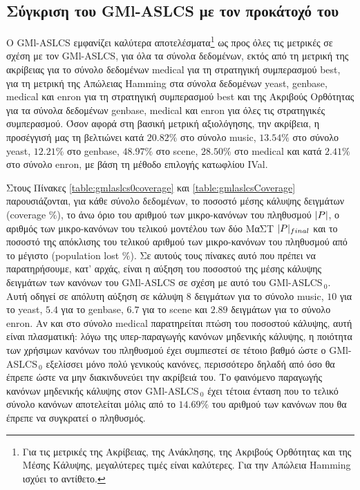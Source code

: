 \subsection{Σύγκριση του GMl-ASLCS με τον προκάτοχό του}
Ο GMl-ASLCS εμφανίζει καλύτερα αποτελέσματα\footnote{Για τις μετρικές της Ακρίβειας, της Ανάκλησης, της Ακριβούς Ορθότητας και της Μέσης Κάλυψης, μεγαλύτερες τιμές είναι καλύτερες. Για την Απώλεια Hamming ισχύει το αντίθετο.} ως προς όλες τις μετρικές σε σχέση με τον GMl-ASLCS, για όλα τα σύνολα δεδομένων, εκτός από τη μετρική της ακρίβειας για το σύνολο δεδομένων medical για τη στρατηγική συμπερασμού best, για τη μετρική της Απώλειας Hamming στα σύνολα δεδομένων yeast, genbase, medical και enron για τη στρατηγική συμπερασμού best και της Ακριβούς Ορθότητας για τα σύνολα δεδομένων genbase, medical και enron για όλες τις στρατηγικές συμπερασμού. Όσον αφορά στη βασική μετρική αξιολόγησης, την ακρίβεια, η προσέγγισή μας τη βελτιώνει κατά $20.82\%$ στο σύνολο music, $13.54\%$ στο σύνολο yeast, $12.21\%$ στο genbase,  
$48.97\%$ στο scene, $28.50\%$ στο medical και κατά $2.41\%$ στο σύνολο enron, με βάση τη μέθοδο επιλογής κατωφλίου IVal.

Στους Πίνακες \ref{table:gmlaslcs0coverage} και \ref{table:gmlaslcsCoverage} παρουσιάζονται, για κάθε σύνολο δεδομένων, το ποσοστό μέσης κάλυψης δειγμάτων (coverage $\%$), το άνω όριο του αριθμού των μικρο-κανόνων του πληθυσμού $\lvert P\rvert$, ο αριθμός των μικρο-κανόνων του τελικού μοντέλου των δύο ΜαΣΤ $\lvert P\rvert_{final}$ και το ποσοστό της απόκλισης του τελικού αριθμού των μικρο-κανόνων του πληθυσμού από το μέγιστο (population lost $\%$). Σε αυτούς τους πίνακες αυτό που πρέπει να παρατηρήσουμε, κατ' αρχάς, είναι η αύξηση του ποσοστού της μέσης κάλυψης δειγμάτων των κανόνων του GMl-ASLCS σε σχέση με αυτό του GMl-ASLCS$_{\:0}$. Αυτή οδηγεί σε απόλυτη αύξηση σε κάλυψη $8$ δειγμάτων για το σύνολο music, $10$ για το yeast, $5.4$ για το genbase, $6.7$ για το scene και $2.89$ δειγμάτων για το σύνολο enron. Αν και στο σύνολο medical παρατηρείται πτώση του ποσοστού κάλυψης, αυτή είναι πλασματική: λόγω της υπερ-παραγωγής κανόνων μηδενικής κάλυψης, η ποιότητα των χρήσιμων κανόνων του πληθυσμού έχει συμπιεστεί σε τέτοιο βαθμό ώστε ο GMl-ASLCS$_{\:0}$ εξελίσσει μόνο πολύ γενικούς κανόνες, περισσότερο δηλαδή από όσο θα έπρεπε ώστε να μην διακινδυνεύει την ακρίβειά του. Το φαινόμενο παραγωγής κανόνων μηδενικής κάλυψης στον GMl-ASLCS$_{\:0}$ έχει τέτοια ένταση που το τελικό σύνολο κανόνων αποτελείται μόλις από το $14.69\%$ του αριθμού των κανόνων που θα έπρεπε να συγκρατεί ο πληθυσμός. 

